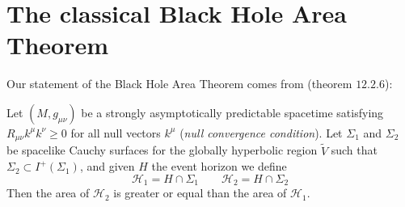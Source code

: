 \section{The classical Black Hole Area Theorem}
\label{sec:classical-bh-area}

Our statement of the Black Hole Area Theorem comes from \cite{wald2010general} (theorem \(12.2.6\)):
\begin{theorem}
	\label{th:classical-bh-area}
	Let \((M, g_{\mu\nu})\) be a strongly asymptotically predictable spacetime satisfying \(R_{\mu\nu}k^{\mu}k^{\nu} \ge 0\) for all null vectors \(k^{\mu}\) (\emph{null convergence condition}). Let \(\Sigma_1\) and \(\Sigma_2\) be spacelike Cauchy surfaces for the globally hyperbolic region \(\tilde{V}\) such that \(\Sigma_2 \subset I^+(\Sigma_1)\), and given \(H\) the event horizon we define
	\[
	\mathscr{H}_1 = H \cap \Sigma_1 \quad \quad \mathscr{H}_2 = H \cap \Sigma_2
	\]
	Then the area of \(\mathscr{H}_2\) is greater or equal than the area of \(\mathscr{H}_1\).
\end{theorem}

